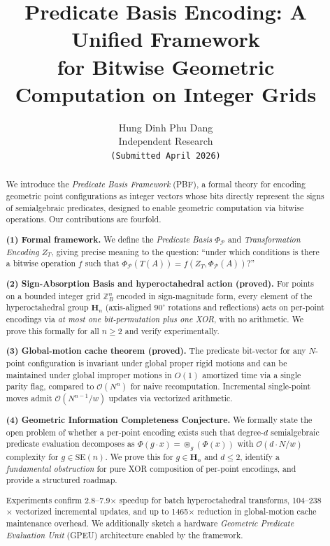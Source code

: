 \documentclass[11pt,letterpaper]{article}
\title{\textbf{Predicate Basis Encoding: A Unified Framework\\
for Bitwise Geometric Computation on Integer Grids}}
\author{Hung Dinh Phu Dang\\[2pt]
\small Independent Research\\[1pt]
\small\texttt{(Submitted April 2026)}
}
\date{}
\newcommand{\ZBd}[1]{\mathbb{Z}_B^{#1}}
\newcommand{\Hn}{\mathbf{H}_n}
\newcommand{\SEn}{\mathrm{SE}(n)}
\newcommand{\PhiP}{\Phi_{\mathcal{P}}}
\newcommand{\cO}{\mathcal{O}}
\newcommand{\oast}{\circledast}
\newcommand{\wt}{w}       %
\begin{document}
\maketitle

\begin{abstract}
We introduce the \emph{Predicate Basis Framework} (PBF), a formal theory for encoding
geometric point configurations as integer vectors whose bits directly represent the
signs of semialgebraic predicates, designed to enable geometric computation via
bitwise operations.  Our contributions are fourfold.

\textbf{(1) Formal framework.}  We define the \emph{Predicate Basis} $\PhiP$ and
\emph{Transformation Encoding} $Z_T$, giving precise meaning to the question:
``under which conditions is there a bitwise operation $f$ such that
$\PhiP(T(A))=f(Z_T,\PhiP(A))$?''

\textbf{(2) Sign-Absorption Basis and hyperoctahedral action (proved).}
For points on a bounded integer grid $\ZBd{n}$ encoded in sign-magnitude form, every
element of the hyperoctahedral group $\Hn$ (axis-aligned $90^\circ$ rotations and
reflections) acts on per-point encodings via \emph{at most one bit-permutation plus
one XOR}, with no arithmetic.  We prove this formally for all $n\!\ge\!2$ and verify
experimentally.

\textbf{(3) Global-motion cache theorem (proved).}
The predicate bit-vector for any $N$-point configuration is invariant under global
proper rigid motions and can be maintained under global improper motions in $O(1)$
amortized time via a single parity flag, compared to $\cO(N^n)$ for naive recomputation.
Incremental single-point moves admit $\cO(N^{n-1}/\wt)$ updates via vectorized arithmetic.

\textbf{(4) Geometric Information Completeness Conjecture.}
We formally state the open problem of whether a per-point encoding exists such that
degree-$d$ semialgebraic predicate evaluation decomposes as $\Phi(g\cdot x)=
\oast_g(\Phi(x))$ with $\cO(d\cdot N/\wt)$ complexity for $g\in\SEn$.  We prove this
for $g\in\Hn$ and $d\le 2$, identify a \emph{fundamental obstruction} for pure XOR
composition of per-point encodings, and provide a structured roadmap.

Experiments confirm 2.8--7.9$\times$ speedup for batch hyperoctahedral transforms,
104--238$\times$ vectorized incremental updates, and up to 1465$\times$ reduction in
global-motion cache maintenance overhead.  We additionally sketch a hardware
\emph{Geometric Predicate Evaluation Unit} (GPEU) architecture enabled by the framework.
\end{abstract}
\end{document}
